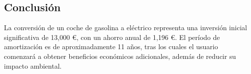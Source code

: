 \documentclass[10pt, a4paper, twoside, twocolumn]{article}
\let\OldTextField\TextField
\renewcommand{\TextField}[2][]{%
  \raisebox{-0.1ex}{\OldTextField[height=.95em,  bordercolor={1 1 1}, backgroundcolor={1 1 1},#1]{#2}}%
}
\begin{document}
\begin{Form}
	\section{Conclusión}
	La conversión de un coche de gasolina a eléctrico representa una inversión inicial significativa de 13,000 €, con un ahorro anual de 1,196 €. El período de amortización es de aproximadamente 11 años, tras los cuales el usuario comenzará a obtener beneficios económicos adicionales, además de reducir su impacto ambiental.
	


	\TextField[name=I0 ,width=0cm]{}
	\TextField[name=Bt,width=0cm]{}






\end{Form}
\end{document}
